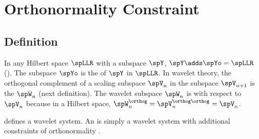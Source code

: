 ﻿%

\chapter{Orthonormality Constraint}
\label{chp:ortho}


\section{Definition}
In any Hilbert space $\spLLR$ with a subspace $\spY$, $\spY\adds\spYo=\spLLR$
().
The subspace $\spYo$ is the  of $\spY$ in $\spLLR$.
In wavelet theory, the orthogonal complement of a scaling subspace $\spV_n$ in the subspace $\spV_{n+1}$
is the  $\spW_n$ (next definition).
The wavelet subspace $\spW_n$ is  with respect to $\spV_n$ because
in a Hilbert space, $\spW_n^\orthog = \spV_n^{\orthog\orthog} = \spV_n$.

 defines a  wavelet system.
An  is simply a wavelet system
with additional constraints of orthonormality .


